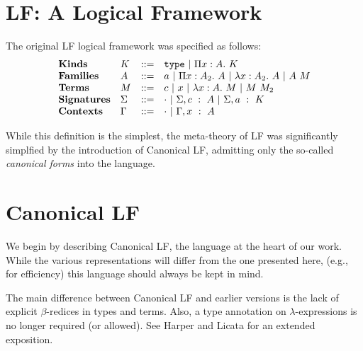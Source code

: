 

\section{LF: A Logical Framework}

The original LF logical framework was specified as follows:
$$
\begin{array}{llll}
\textbf{Kinds} & K & ::= & \mathtt{type} \ |\  \Pi x : A.\ K \\
\textbf{Families} & A & ::= & a \ |\  \Pi x : A_2.\ A \ |\  \lambda x : A_2.\ A \ |\  A\ M \\
\textbf{Terms} & M & ::= & c \ |\  x \ |\  \lambda x : A.\ M \ |\  M\ M_2 \\
\textbf{Signatures} & \Sigma & ::= & \cdot \ |\  \Sigma,c\ :\ A 
\ |\  \Sigma,a\ :\ K\\
\textbf{Contexts} & \Gamma & ::= & \cdot \ |\  \Gamma,x\ :\ A\\
\end{array}
$$

While this definition is the simplest, the meta-theory of LF was
significantly simplfied by the introduction of Canonical LF, admitting
only the so-called \emph{canonical forms} into the language.


\section{Canonical LF}
We begin by describing Canonical LF, the language at the heart of our
work.  While the various representations will differ from the one presented here, 
(e.g., for efficiency) this language should always be kept in mind.

The main difference between Canonical LF and earlier versions
is the lack of explicit $\beta$-redices in types and terms.  
Also, a type annotation on $\lambda$-expressions is no longer required (or allowed).
See Harper and Licata\cite{Harper:2006:Mechanizing} for an extended
exposition.

